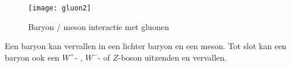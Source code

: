 \begin{figure}[h]
\noindent \begin{centering}
\texttt{[image: gluon2]}
\par\end{centering}

\caption{Baryon / meson interactie met gluonen}
\end{figure}


Een baryon kan vervallen in een lichter baryon en een meson. Tot slot
kan een baryon ook een $W^{+}$- , $W^{-}$- of $Z$-boson uitzenden
en vervallen.


